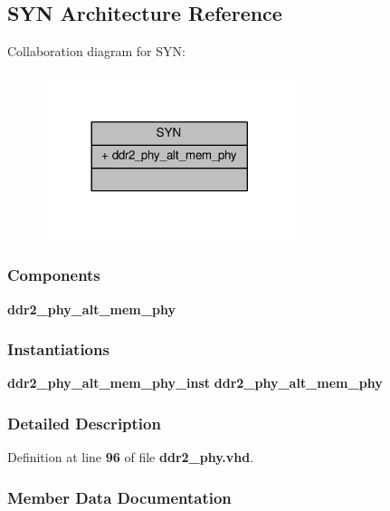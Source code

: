 \subsection{S\+YN Architecture Reference}
\label{classddr2__phy_1_1SYN}


Collaboration diagram for S\+YN\+:\nopagebreak
\begin{figure}[H]
\begin{center}
\leavevmode
\includegraphics[width=209pt]{d8/d79/classddr2__phy_1_1SYN__coll__graph}
\end{center}
\end{figure}
\subsubsection*{Components}
 \begin{DoxyCompactItemize}
\item 
{\bf ddr2\+\_\+phy\+\_\+alt\+\_\+mem\+\_\+phy}  {\bfseries }  
\end{DoxyCompactItemize}
\subsubsection*{Instantiations}
 \begin{DoxyCompactItemize}
\item 
{\bf ddr2\+\_\+phy\+\_\+alt\+\_\+mem\+\_\+phy\+\_\+inst}  {\bfseries ddr2\+\_\+phy\+\_\+alt\+\_\+mem\+\_\+phy}   
\end{DoxyCompactItemize}


\subsubsection{Detailed Description}


Definition at line {\bf 96} of file {\bf ddr2\+\_\+phy.\+vhd}.



\subsubsection{Member Data Documentation}
